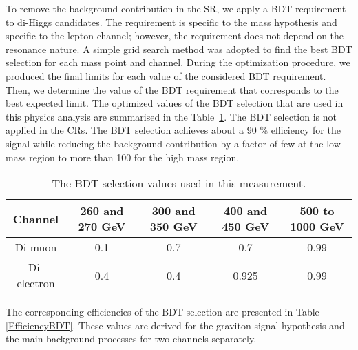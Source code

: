 To remove the background contribution in the SR, we apply a BDT requirement to di-Higgs candidates. The requirement is specific to the mass hypothesis and specific to the lepton channel; however, the requirement does not depend on the resonance nature. A simple grid search method was adopted to find the best BDT selection for each mass point and channel. During the optimization procedure, we produced the final limits for each value of the considered BDT requirement. Then, we determine the value of the BDT requirement that corresponds to the best expected limit. The optimized values of the BDT selection that are used in this physics analysis are summarised in the Table~\ref{suboptCut}. The BDT selection is not applied in the CRs. The BDT selection achieves about a 90 \% efficiency for the signal while reducing the background contribution by a factor of few at the low mass region to more than 100 for the high mass region.

\begin{table}
\begin{center} 
\caption{The BDT selection values used in this measurement.}
\begin{tabular}{ |c|c|c|c|c| } \hline%
Channel & 260 and 270 GeV & 300 and 350 GeV & 400 and 450 GeV & 500 to 1000 GeV \\ \hline
Di-muon & 0.1 & 0.7 & 0.7 & 0.99 \\ %
Di-electron & 0.4 & 0.4 & 0.925 & 0.99\\ \hline%
\end{tabular}
\label{suboptCut}
\end{center} 
\end{table}

The corresponding efficiencies of the BDT selection are presented in Table \ref{EfficiencyBDT}. These values are derived for the graviton signal hypothesis and the main background processes for two channels separately. 

